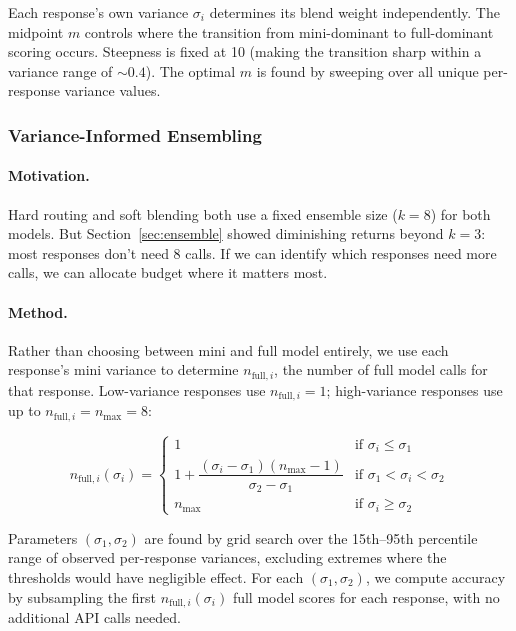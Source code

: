 \documentclass{article}
\begin{document}
Each response's own variance $\sigma_i$ determines its blend weight independently. The midpoint $m$ controls where the transition from mini-dominant to full-dominant scoring occurs. Steepness is fixed at 10 (making the transition sharp within a variance range of ${\sim}0.4$). The optimal $m$ is found by sweeping over all unique per-response variance values.

\subsubsection{Variance-Informed Ensembling}
\label{sec:var-informed}

\paragraph{Motivation.} Hard routing and soft blending both use a fixed ensemble size ($k{=}8$) for both models. But Section~\ref{sec:ensemble} showed diminishing returns beyond $k{=}3$: most responses don't need 8 calls. If we can identify which responses need more calls, we can allocate budget where it matters most.

\paragraph{Method.} Rather than choosing between mini and full model entirely, we use each response's mini variance to determine $n_{\text{full},i}$, the number of full model calls for that response. Low-variance responses use $n_{\text{full},i} = 1$; high-variance responses use up to $n_{\text{full},i} = n_{\max} = 8$:

\begin{equation}
n_{\text{full},i}(\sigma_i) = \begin{cases}
1 & \text{if } \sigma_i \leq \sigma_1 \\
1 + \dfrac{(\sigma_i - \sigma_1)(n_{\max} - 1)}{\sigma_2 - \sigma_1} & \text{if } \sigma_1 < \sigma_i < \sigma_2 \\
n_{\max} & \text{if } \sigma_i \geq \sigma_2
\end{cases}
\label{eq:var-informed}
\end{equation}

Parameters $(\sigma_1, \sigma_2)$ are found by grid search over the 15th--95th percentile range of observed per-response variances, excluding extremes where the thresholds would have negligible effect. For each $(\sigma_1, \sigma_2)$, we compute accuracy by subsampling the first $n_{\text{full},i}(\sigma_i)$ full model scores for each response, with no additional API calls needed.
\end{document}
